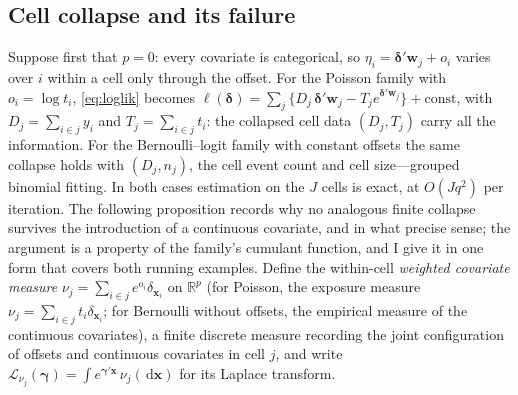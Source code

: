 \documentclass[11pt]{article}
\newcommand{\R}{\mathbb{R}}
\newcommand{\dd}{\,\mathrm{d}}
\newcommand{\bgamma}{\bm{\gamma}}
\newcommand{\bdelta}{\bm{\delta}}
\newcommand{\bx}{\mathbf{x}}
\newcommand{\bw}{\mathbf{w}}
\begin{document}
\subsection{Cell collapse and its failure}\label{sec:sufficiency}

Suppose first that $p = 0$: every covariate is categorical, so
$\eta_i = \bdelta'\bw_j + o_i$ varies over $i$ within a cell only through
the offset.  For the Poisson family with $o_i = \log t_i$,
\eqref{eq:loglik} becomes
$\ell(\bdelta) = \sum_j \{ D_j\, \bdelta'\bw_j - T_j e^{\bdelta'\bw_j} \}
+ \mathrm{const}$, with $D_j = \sum_{i \in j} y_i$ and
$T_j = \sum_{i \in j} t_i$: the collapsed cell data $(D_j, T_j)$ carry
all the information.  For the Bernoulli--logit family with constant
offsets the same collapse holds with $(D_j, n_j)$, the cell event count
and cell size---grouped binomial fitting.  In both cases estimation on
the $J$ cells is exact, at $O(Jq^2)$ per iteration.  The following
proposition records why no analogous finite collapse survives the
introduction of a continuous covariate, and in what precise sense; the
argument is a property of the family's cumulant function, and I give it
in one form that covers both running examples.  Define the within-cell
\emph{weighted covariate measure}
$\nu_j = \sum_{i \in j} e^{o_i} \delta_{\bx_i}$ on $\R^p$ (for Poisson,
the exposure measure $\nu_j = \sum_{i \in j} t_i \delta_{\bx_i}$; for
Bernoulli without offsets, the empirical measure of the continuous
covariates), a finite discrete measure recording the joint configuration
of offsets and continuous covariates in cell $j$, and write
$\mathcal{L}_{\nu_j}(\bgamma) = \int e^{\bgamma'\bx}\,\nu_j(\dd\bx)$ for
its Laplace transform.
\end{document}
